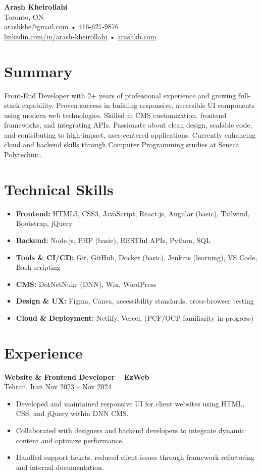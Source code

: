 \documentclass[letterpaper,11pt]{article}
\begin{document}

{\LARGE \textbf{Arash Kheirollahi}}\\[0.2em]
Toronto, ON \\
\href{mailto:arashkhe@gmail.com}{arashkhe@gmail.com} • 416-627-9876 \\
\href{https://linkedin.com/in/arash-kheirollahi}{linkedin.com/in/arash-kheirollahi} • \href{https://arashkh.com}{arashkh.com}

\vspace{0.8em}

\section*{Summary}
Front-End Developer with 2+ years of professional experience and growing full-stack capability. Proven success in building responsive, accessible UI components using modern web technologies. Skilled in CMS customization, frontend frameworks, and integrating APIs. Passionate about clean design, scalable code, and contributing to high-impact, user-centered applications. Currently enhancing cloud and backend skills through Computer Programming studies at Seneca Polytechnic.

\section*{Technical Skills}
\begin{itemize}[leftmargin=*]
  \item \textbf{Frontend:} HTML5, CSS3, JavaScript, React.js, Angular (basic), Tailwind, Bootstrap, jQuery
  \item \textbf{Backend:} Node.js, PHP (basic), RESTful APIs, Python, SQL
  \item \textbf{Tools \& CI/CD:} Git, GitHub, Docker (basic), Jenkins (learning), VS Code, Bash scripting
  \item \textbf{CMS:} DotNetNuke (DNN), Wix, WordPress
  \item \textbf{Design \& UX:} Figma, Canva, accessibility standards, cross-browser testing
  \item \textbf{Cloud \& Deployment:} Netlify, Vercel, (PCF/OCP familiarity in progress)
\end{itemize}

\section*{Experience}
\textbf{Website \& Frontend Developer – EzWeb}\\
Tehran, Iran \hfill Nov 2023 -- Nov 2024
\begin{itemize}[leftmargin=*]
  \item Developed and maintained responsive UI for client websites using HTML, CSS, and jQuery within DNN CMS.
  \item Collaborated with designers and backend developers to integrate dynamic content and optimize performance.
  \item Handled support tickets, reduced client issues through framework refactoring and internal documentation.
\end{itemize}
\end{document}
